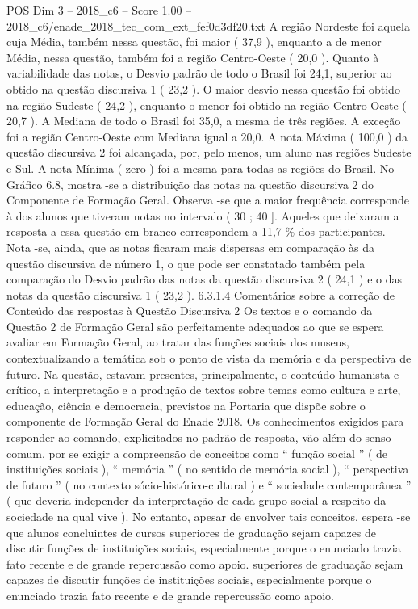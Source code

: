 \begin{textsample}{POS Dim 3 – 2018\_c6 – Score 1.00 – 2018\_c6/enade\_2018\_tec\_com\_ext\_fef0d3df20.txt}
A região Nordeste foi aquela cuja Média, também nessa questão, foi maior ( 37,9 ), enquanto a de menor Média, nessa questão, também foi a região Centro-Oeste ( 20,0 ).
Quanto à variabilidade das notas, o Desvio padrão de todo o Brasil foi 24,1, superior ao obtido na questão discursiva 1 ( 23,2 ).
O maior desvio nessa questão foi obtido na região Sudeste ( 24,2 ), enquanto o menor foi obtido na região Centro-Oeste ( 20,7 ).
A Mediana de todo o Brasil foi 35,0, a mesma de três regiões.
A exceção foi a região Centro-Oeste com Mediana igual a 20,0.
A nota Máxima ( 100,0 ) da questão discursiva 2 foi alcançada, por, pelo menos, um aluno nas regiões Sudeste e Sul.
A nota Mínima ( zero ) foi a mesma para todas as regiões do Brasil.
No Gráfico 6.8, mostra -se a distribuição das notas na questão discursiva 2 do Componente de Formação Geral.
Observa -se que a maior frequência corresponde à dos alunos que tiveram notas no intervalo ( 30 ; 40 ].
Aqueles que deixaram a resposta a essa questão em branco correspondem a 11,7 \% dos participantes.
Nota -se, ainda, que as notas ficaram mais dispersas em comparação às da questão discursiva de número 1, o que pode ser constatado também pela comparação do Desvio padrão das notas da questão discursiva 2 ( 24,1 ) e o das notas da questão discursiva 1 ( 23,2 ). 6.3.1.4 Comentários sobre a correção de Conteúdo das respostas à Questão Discursiva 2 Os textos e o comando da Questão 2 de Formação Geral são perfeitamente adequados ao que se espera avaliar em Formação Geral, ao tratar das funções sociais dos museus, contextualizando a temática sob o ponto de vista da memória e da perspectiva de futuro.
Na questão, estavam presentes, principalmente, o conteúdo humanista e crítico, a interpretação e a produção de textos sobre temas como cultura e arte, educação, ciência e democracia, previstos na Portaria que dispõe sobre o componente de Formação Geral do Enade 2018.
Os conhecimentos exigidos para responder ao comando, explicitados no padrão de resposta, vão além do senso comum, por se exigir a compreensão de conceitos como “ função social ” ( de instituições sociais ), “ memória ” ( no sentido de memória social ), “ perspectiva de futuro ” ( no contexto sócio-histórico-cultural ) e “ sociedade contemporânea ” ( que deveria independer da interpretação de cada grupo social a respeito da sociedade na qual vive ).
No entanto, apesar de envolver tais conceitos, espera -se que alunos concluintes de cursos superiores de graduação sejam capazes de discutir funções de instituições sociais, especialmente porque o enunciado trazia fato recente e de grande repercussão como apoio. superiores de graduação sejam capazes de discutir funções de instituições sociais, especialmente porque o enunciado trazia fato recente e de grande repercussão como apoio.

\end{textsample}
